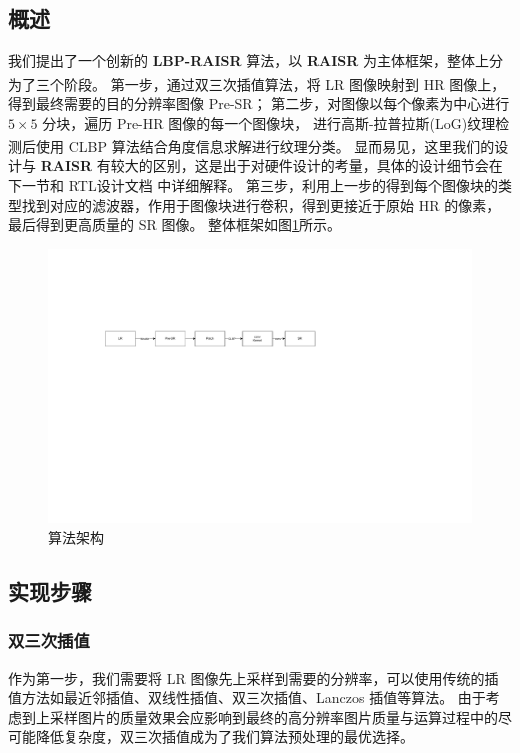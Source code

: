 \documentclass[12pt, a4paper, oneside]{ctexbook}
\begin{document}
	\subsection{概述}
	我们提出了一个创新的 \textbf{LBP-RAISR} 算法，以 \textbf{RAISR} 为主体框架，整体上分为了三个阶段。
	第一步，通过双三次插值算法\textsuperscript{\cite{4}\cite{5}}，将 LR 图像映射到 HR 图像上，得到最终需要的目的分辨率图像 Pre-SR；
	第二步，对图像以每个像素为中心进行 $5\times5$ 分块，遍历 Pre-HR 图像的每一个图像块，
	进行高斯-拉普拉斯(LoG)纹理检测后使用 CLBP 算法\textsuperscript{\cite{8}\cite{9}}结合角度信息求解进行纹理分类。
	显而易见，这里我们的设计与 \textbf{RAISR} 有较大的区别，这是出于对硬件设计的考量，具体的设计细节会在下一节和 RTL设计文档 中详细解释。
	第三步，利用上一步的得到每个图像块的类型找到对应的滤波器，作用于图像块进行卷积，得到更接近于原始 HR 的像素，最后得到更高质量的 SR 图像。
	整体框架如图\ref{overview}所示。
	\begin{figure}[h]
		\centering
		\includegraphics[scale=0.72]{./pic/overview.pdf}
		\caption{算法架构}
		\label{overview}
	\end{figure}
	\subsection{实现步骤}
	\subsubsection{双三次插值}
	作为第一步，我们需要将 LR 图像先上采样到需要的分辨率，可以使用传统的插值方法如最近邻插值、双线性插值、双三次插值、Lanczos 插值等算法。
	由于考虑到上采样图片的质量效果会应影响到最终的高分辨率图片质量与运算过程中的尽可能降低复杂度，双三次插值成为了我们算法预处理的最优选择。
\end{document}
